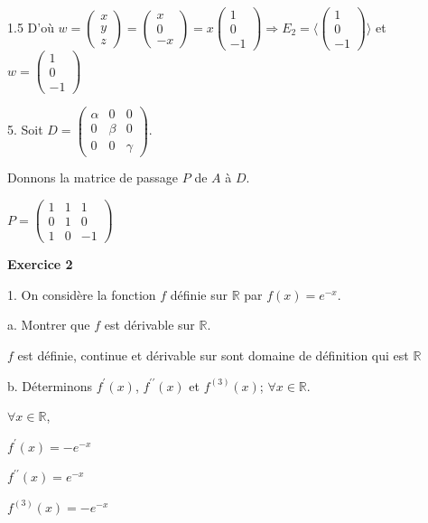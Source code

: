 \documentclass[12pt]{article}
\begin{document}
\begin{spacing}{1.5}
D'où $w=\begin{pmatrix}
x\\
y\\
z
\end{pmatrix}=\begin{pmatrix}
x\\
0\\
-x
\end{pmatrix}=x\begin{pmatrix}
1\\
0\\
-1
\end{pmatrix}\Rightarrow E_2=\langle \begin{pmatrix}
1\\
0\\
-1
\end{pmatrix}\rangle$ et $w=\begin{pmatrix}
1 \\
0 \\
-1
\end{pmatrix}$


5. Soit $D=\begin{pmatrix}
\alpha & 0 & 0 \\ 
0 & \beta & 0 \\ 
0 & 0 & \gamma
\end{pmatrix} $.

Donnons la matrice de passage $P$ de $A$ à $D$.

$P=\begin{pmatrix}
1 & 1 & 1  \\ 
0 & 1 & 0  \\ 
1 & 0 & -1
\end{pmatrix}$

\medskip
\textbf{Exercice 2}

1. On considère la fonction $f$ définie sur $\mathbb{R}$ par $f(x)=e^{-x}$.


a. Montrer que $f$ est dérivable sur $\mathbb{R}$.

$f$ est définie, continue et dérivable sur sont domaine de définition qui est $\mathbb{R}$


b. Déterminons $f^\prime(x)$, $f^{\prime\prime}(x)$ et $f^{(3)}(x)$; $\forall {x}\in \mathbb{R}$.

$\forall {x}\in \mathbb{R}$,

$f^\prime(x)=-e^{-x}$

$f^{\prime\prime}(x)=e^{-x}$

$f^{(3)}(x)=-e^{-x}$




\end{spacing}
\end{document}

